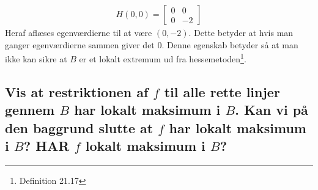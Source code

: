 \begin{align}
    H(0,0) = 
    \left[
        \begin{array}{cc}
            0 & 0\\0 & -2
        \end{array}
    \right] 
\end{align}
Heraf aflæses egenværdierne til at være $(0,-2)$.
Dette betyder at hvis man ganger egenværdierne sammen giver det 0. Denne egenskab betyder så at man ikke kan sikre at $B$ er et lokalt extremum ud fra hessemetoden\footnote{Definition 21.17}.



\subsection{Vis at restriktionen af $f$ til alle rette linjer gennem $B$ har lokalt maksimum i $B$. Kan vi på den baggrund slutte at $f$ har lokalt maksimum i $B$? HAR $f$ lokalt maksimum i $B$?}




